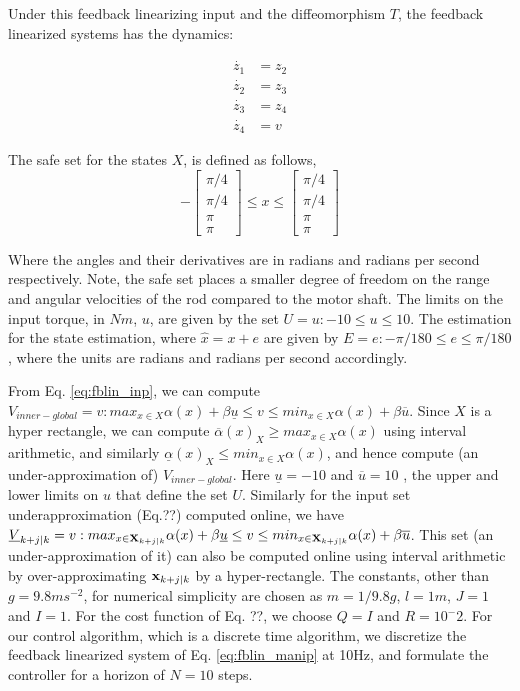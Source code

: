Under this feedback linearizing input and the diffeomorphism $T$, the feedback linearized systems has the dynamics:

\begin{subequations}
\begin{align}
\label{eq:fblin_manip}
\dot{z_1} &= z_2 \\
\dot{z_2} &= z_3 \\
\dot{z_3} &= z_4 \\
\dot{z_4} &= v
\end{align}
\end{subequations}

The safe set for the states $X$, is defined as follows, 
\begin{equation}
 -\begin{bmatrix} \pi/4  \\ \pi/4  \\ \pi \\ \pi \end{bmatrix} \leq x \leq \begin{bmatrix} \pi/4  \\ \pi/4  \\ \pi \\ \pi \end{bmatrix}
\end{equation}

Where the angles and their derivatives are in radians and radians per second respectively. Note, the safe set places a smaller degree of freedom on the range and angular velocities of the rod compared to the motor shaft.
The limits on the input torque, in $Nm$, $u$, are given by the set $U = u :-10 \leq u \leq 10$. The estimation for the state estimation, where $\hat{x} = x + e$ are given by $E = e:-\pi /180 \leq e \leq \pi /180 $, where the units are radians and radians per second accordingly. 

From Eq. \ref{eq:fblin_inp}, we can compute $V_{inner-global} =v: max_{x\in X}\alpha(x) + \beta \underline{u} \leq v \leq min_{x\in X}\alpha(x) + \beta \overline{u}$. Since $X$ is a hyper rectangle, we can compute $\overline{\alpha}(x)_{X} \geq  max_{x\in X}\alpha(x)$ using interval arithmetic, and similarly $\underline{\alpha}(x)_{X} \leq  min_{x\in X}\alpha(x)$, and hence compute (an under-approximation of) $V_{inner-global}$. Here $\underline{u}=-10$ and $\overline{u}=10$ , the upper and lower limits on $u$ that define the set $U$.
Similarly for the input set underapproximation (Eq.??) computed online, we have $\underline{V}_{k+j|k} = v:   max_{x\in \mathbf{X}_{k+j|k}} \alpha(x) + \beta \underline{u} \leq v \leq  min_{x\in \mathbf{X}_{k+j|k}}\alpha(x) + \beta \overline{u}$. This set (an under-approximation of it) can also be computed online using interval arithmetic by over-approximating $\mathbf{x}_{k+j|k}$ by a hyper-rectangle. The constants, other than $g=9.8ms^{-2}$, for numerical simplicity are chosen as $m=1/9.8g$, $l=1m$, $J=1$ and $I=1$. For the cost function of Eq. ??, we choose $Q=I$ and $R=10^-2$. For our control algorithm, which is a discrete time algorithm, we discretize the feedback linearized system of Eq. \ref{eq:fblin_manip} at 10Hz, and formulate the controller for a horizon of $N=10$ steps.

